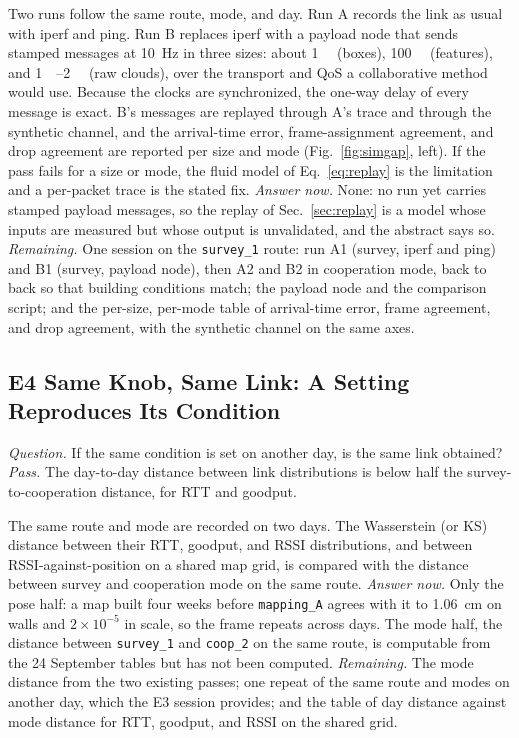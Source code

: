 \documentclass[journal]{IEEEtran}
\begin{document}
Two runs follow the same route, mode, and day. Run A records the link
as usual with iperf and ping. Run B replaces iperf with a payload node
that sends stamped messages at \SI{10}{\hertz} in three sizes: about
\SI{1}{\kilo\byte} (boxes), \SI{100}{\kilo\byte} (features), and
\SIrange{1}{2}{\mega\byte} (raw clouds), over the transport and QoS a
collaborative method would use. Because the clocks are synchronized,
the one-way delay of every message is exact. B's messages are replayed
through A's trace and through the synthetic channel, and the
arrival-time error, frame-assignment agreement, and drop agreement are
reported per size and mode (Fig.~\ref{fig:simgap}, left). If the pass
fails for a size or mode, the fluid model of Eq.~\eqref{eq:replay} is
the limitation and a per-packet trace is the stated fix.
\emph{Answer now.} None: no run yet carries stamped payload messages,
so the replay of Sec.~\ref{sec:replay} is a model whose inputs are
measured but whose output is unvalidated, and the abstract says so.
\emph{Remaining.} One session on the \texttt{survey\_1} route: run
A1 (survey, iperf and ping) and B1 (survey, payload node), then A2 and
B2 in cooperation mode, back to back so that building conditions
match; the payload node and the comparison script; and the per-size,
per-mode table of arrival-time error, frame agreement, and drop
agreement, with the synthetic channel on the same axes.




\subsection{E4 Same Knob, Same Link: A Setting Reproduces Its Condition}
\emph{Question.} If the same condition is set on another day, is the
same link obtained? \emph{Pass.} The day-to-day distance between link
distributions is below half the survey-to-cooperation distance, for
RTT and goodput.

The same route and mode are recorded on two days. The Wasserstein (or
KS) distance between their RTT, goodput, and RSSI distributions, and
between RSSI-against-position on a shared map grid, is compared with
the distance between survey and cooperation mode on the same route.
\emph{Answer now.} Only the pose half: a map built four weeks before
\texttt{mapping\_A} agrees with it to \SI{1.06}{\centi\metre} on
walls and $2\times10^{-5}$ in scale, so the frame repeats across days.
The mode half, the distance between \texttt{survey\_1} and
\texttt{coop\_2} on the same route, is computable from the 24
September tables but has not been computed. \emph{Remaining.} The
mode distance from the two existing passes; one repeat of the same
route and modes on another day, which the E3 session provides; and the
table of day distance against mode distance for RTT, goodput, and
RSSI on the shared grid.
\end{document}
